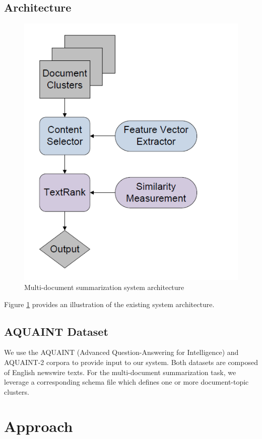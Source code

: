 \documentclass[11pt]{article}
\begin{document}
	\subsection{Architecture}
	\begin{figure}
		\includegraphics[width=\linewidth]{arch.PNG}
		\caption{Multi-document summarization system architecture}
		\label{fig:arch}
	\end{figure}
	
	Figure \ref{fig:arch} provides an illustration of the existing system architecture.
	
	\subsection{AQUAINT Dataset}
	We use the AQUAINT (Advanced Question-Answering for Intelligence) and AQUAINT-2 corpora to provide input to our system. Both datasets are composed of English newswire texts. For the multi-document summarization task, we leverage a corresponding schema file which defines one or more document-topic clusters. 
	
	\section{Approach}
	
\end{document}
